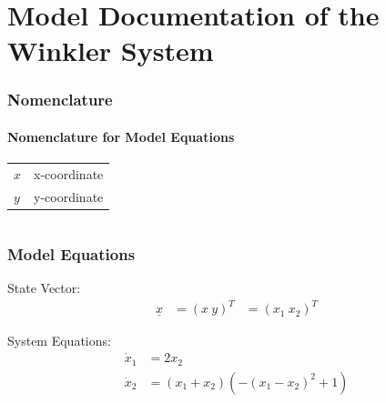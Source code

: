 \documentclass[10pt,a4paper]{article}
\begin{document}
	\part*{Model Documentation of the \\ Winkler System} %
	
	
	\section{Nomenclature} %
	\subsection{Nomenclature for Model Equations} %
	
	\begin{tabular}{ll}
		$x$ & x-coordinate \\
		$y$ & y-coordinate \\
		
				
	\end{tabular}
	 
	
	\begin{tabular}{ll}

	\end{tabular}
	
	
	\section{Model Equations} %
	
	State Vector:
	\begin{align*}
		\underline{x} &= (x \ y)^T &= (x_1 \ x_2)^T 
	\end{align*}
	
	\noindent System Equations:			
	\begin{subequations}
	\begin{align}
		\dot{x}_1 &= 2x_2 \\
		\dot{x}_2 &= (x_1 + x_2)(-(x_1 - x_2)^2 + 1)
	\end{align}
	\end{subequations}

	
	

	
\end{document}
